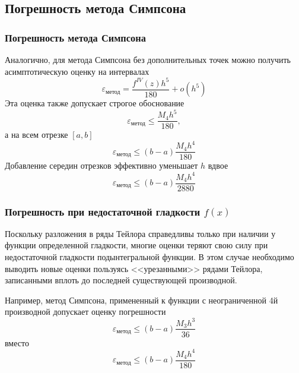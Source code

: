 \documentclass[apectratio=43,unicode]{beamer}
\begin{document}
\subsection{Погрешность метода Симпсона}
\begin{frame}
\frametitle{Погрешность метода Симпсона}
	Аналогично, для метода Симпсона без дополнительных точек можно получить
	асимптотическую оценку на интервалах
	\[
	\varepsilon_{\text{метод}} = \frac{f^{IV}(z) h^5}{180} + o(h^5)
	\]
	Эта оценка также допускает строгое обоснование
	\[
	\varepsilon_{\text{метод}} \leq \frac{M_4 h^5}{180},
	\]
	а на всем отрезке $[a,b]$
	\[
	\varepsilon_{\text{метод}} \leq (b-a)\frac{M_4 h^4}{180}
	\]
	Добавление середин отрезков эффективно уменьшает $h$ вдвое
	\[
	\varepsilon_{\text{метод}} \leq (b-a)\frac{M_4 h^4}{2880}
	\]
\end{frame}

\begin{frame}
\frametitle{Погрешность при недостаточной гладкости $f(x)$}
	Поскольку разложения в ряды Тейлора справедливы только
	при наличии у функции определенной гладкости,
	многие оценки теряют свою силу при недостаточной гладкости
	подынтегральной функции. В этом случае необходимо выводить новые оценки пользуясь
	<<урезанными>> рядами Тейлора, записанными вплоть до последней существующей производной.

	Например, метод Симпсона, примененный к функции с неограниченной 4й производной допускает оценку погрешности
	\[
	\varepsilon_{\text{метод}} \leq (b-a)\frac{M_3 h^3}{36}
	\]
	вместо
	\[
	\varepsilon_{\text{метод}} \leq (b-a)\frac{M_4 h^4}{180}
	\]
\end{frame}
\end{document}
